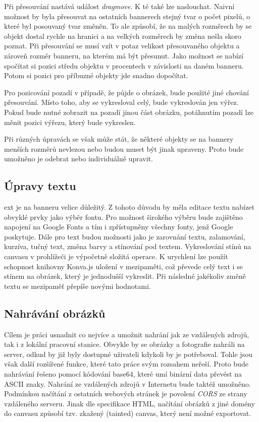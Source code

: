         Při přesouvání nastává událost \emph{dragmove}. K té také lze naslouchat. Naivní možnost by byla přesouvat na ostatních bannerech stejný tvar o počet pixelů,
        o které byl posouvaný tvar změněn. To ale způsobí, že na malých rozměrech by se objekt dostal rychle na hranici a na velkých rozměrech by
        změna nešla skoro poznat. Při přesouvání se musí vzít v potaz velikost přesouvaného objektu a zároveň rozměr banneru, na kterém má být přesunut.
        Jako možnost se nabízí spočítat si pozici středu objektu v procentech v závislosti na daném banneru.
        Potom si pozici pro příbuzné objekty jde snadno dopočítat.

        Pro pozicování pozadí v případě, že půjde o obrázek, bude použité jiné chování přesouvání. Místo toho, aby se vykresloval celý, bude vykreslován jen výřez.
        Pokud bude nutné zobrazit na pozadí jinou část obrázku, potáhnutím pozadí lze měnit pozici výřezu, který bude vykreslen.

        Při různých úpravách se však může stát, že některé objekty se na bannery menších rozměrů nevlezou nebo budou muset být jinak upraveny.
        Proto bude umožněno je odebrat nebo individuálně upravit.

        \subsection{Úpravy textu}
        ext je na banneru velice důležitý. Z tohoto důvodu by měla editace textu nabízet obvyklé prvky jako výběr fontu.
        Pro možnost širokého výběru bude zajištěno napojení na Google Fonts a tím i zpřístupněny všechny fonty, jenž Google poskytuje.
        Dále pro text budou možnosti jako je zarovnání textu, zalamování, kurzíva, tučný text, změna barvy a stínování pod textem.
        Vykreslování stínů na canvasu v prohlížeči je výpočetně složitá operace. K urychlení lze použít schopnost knihovny Konva.js uložení v mezipaměti,
        což převede celý text i se stínem na obrázek,
        který je jednodušší vykreslit. Při následné jakékoliv změně textu se mezipaměť přepíše novými hodnotami.

        \subsection{Nahrávání obrázků}
        Cílem je práci usnadnit co nejvíce a umožnit nahrání jak ze vzdálených zdrojů, tak i z lokální pracovní stanice.
        Obvykle by se obrázky a fotografie nahráli na server, odkud by již byly dostupné uživateli kdykoli by je potřeboval.
        Tohle jsou však další rozšířené funkce, které tato práce svým rozsahem neřeší. Proto bude nahrávání řešeno pomocí kódování base64,
        které umí binární data převést na ASCII znaky. Nahrání ze vzdálených zdrojů v Internetu bude taktéž umožněno. Podmínkou načítání z ostatních webových stránek
        je povolení \emph{CORS} ze strany vzdáleného serveru. Jinak dle specifikace HTML, načítání obrázků z jiné domény do canvasu 
        způsobí tzv. zkažený (tainted) canvas, který není možné exportovat.

